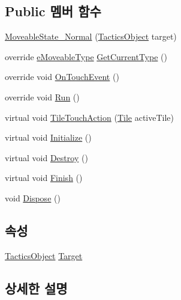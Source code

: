 \subsection*{Public 멤버 함수}
\begin{DoxyCompactItemize}
\item 
\hyperlink{class_moveable_object_1_1_moveable_state___normal_a9e85ae0c8ad364be36ab9332282d99b4}{Moveable\+State\+\_\+\+Normal} (\hyperlink{class_tactics_object}{Tactics\+Object} target)
\item 
override \hyperlink{_moveable_object_8cs_a90215797ba850e199f3ef63d7c56f132}{e\+Moveable\+Type} \hyperlink{class_moveable_object_1_1_moveable_state___normal_a79934a8eb01ed840941ae0aae78e9ab0}{Get\+Current\+Type} ()
\item 
override void \hyperlink{class_moveable_object_1_1_moveable_state___normal_a021502fc37896515d37066f735e31313}{On\+Touch\+Event} ()
\item 
override void \hyperlink{class_moveable_object_1_1_moveable_state___normal_a38a7f7f88e4b203f6202a56d03c4b5b5}{Run} ()
\item 
virtual void \hyperlink{class_moveable_object_1_1_moveable_state_ad12f69b3ef4dadf43105502253b4dc6e}{Tile\+Touch\+Action} (\hyperlink{class_tile}{Tile} active\+Tile)
\item 
virtual void \hyperlink{class_m_c_n_1_1_state_a5be59bc891e64cbbe4322d74a6746908}{Initialize} ()
\item 
virtual void \hyperlink{class_m_c_n_1_1_state_aebf48ef248bbf185d6aae91d9789459e}{Destroy} ()
\item 
virtual void \hyperlink{class_m_c_n_1_1_state_a2492ca731678b8216c02134dddeeb745}{Finish} ()
\item 
void \hyperlink{class_m_c_n_1_1_state_af6df0477e0dead784489688cb2c2093e}{Dispose} ()
\end{DoxyCompactItemize}
\subsection*{속성}
\begin{DoxyCompactItemize}
\item 
\hyperlink{class_tactics_object}{Tactics\+Object} \hyperlink{class_m_c_n_1_1_state_a79a563b32f183c9adc9a96679fc57eb8}{Target}
\end{DoxyCompactItemize}


\subsection{상세한 설명}


